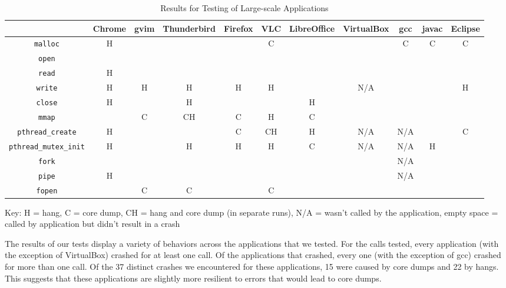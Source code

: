 \begin{table}[h!]
\centering
\caption{Results for Testing of Large-scale Applications}
		\begin{adjustbox}{width=\textwidth}
		\begin{tabular}{|c|c|c|c|c|c|c|c|c|c|c|}
			\hline
			& Chrome & gvim & Thunderbird & Firefox & VLC & LibreOffice & VirtualBox & gcc & javac & Eclipse\\
			\hline
			\texttt{malloc} & H & & & & C &  & & C & C & C \\ \hline
			\texttt{open} & & & & & & & & & & \\ \hline
			\texttt{read} & H & & & & & & & & & \\ \hline
			\texttt{write} & H & H & H & H & H & & N/A& & & H \\ \hline
			\texttt{close} & H & & H & & & H & & & & \\ \hline
			\texttt{mmap} & & C & CH & C & H & C & & & &\\ \hline
			\texttt{pthread\_create}& H & &  & C & CH & H & N/A& N/A& & C \\ \hline
			\texttt{pthread\_mutex\_init} & H & & H & H & H & C & N/A& N/A & H &  \\ \hline
			\texttt{fork} & & & & & & & & N/A & & \\ \hline
			\texttt{pipe} & H & & & & & &  & N/A & &\\ \hline
			\texttt{fopen} & & C & C & & C & & & & & \\ \hline
		\end{tabular} 
		\end{adjustbox}
		Key: H = hang, C = core dump, CH = hang and core dump (in separate runs), N/A = wasn't called by the application, empty space = called by application but didn't result in a crash 
\end{table}

The results of our tests display a variety of behaviors across the applications that we tested. For the calls tested, every application (with the exception of VirtualBox) crashed for at least one call. Of the applications that crashed, every one (with the exception of gcc) crashed for more than one call. Of the 37 distinct crashes we encountered for these applications, 15 were caused by core dumps and 22 by hangs. This suggests that these applications are slightly more resilient to errors that would lead to core dumps. 

